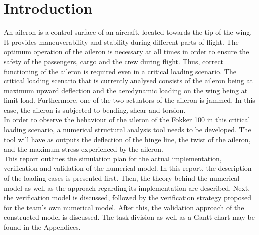 \section{Introduction}
\label{Introduction}


An aileron is a control surface of an aircraft, located towards the tip of the wing. It provides maneuverability and stability during different parts of flight. The optimum operation of the aileron is necessary at all times in order to ensure the safety of the passengers, cargo and the crew during flight. Thus, correct functioning of the aileron is required even in a critical loading scenario. The critical loading scenario that is currently analysed consists of the aileron being at maximum upward deflection and the aerodynamic loading on the
wing being at limit load. Furthermore, one of the two actuators of the aileron is jammed. In this case, the aileron is subjected to bending, shear and torsion. \\

\noindent In order to observe the behaviour of the aileron of the Fokker 100 in this critical loading scenario, a numerical structural analysis tool needs to be developed. The tool will have as outputs the deflection of the hinge line, the twist of the aileron, and the maximum stress experienced by the aileron.\\

\noindent This report outlines the simulation plan for the actual implementation, verification and validation of the numerical model. In this report, the description of the loading cases is presented first. Then, the theory behind the numerical model as well as the approach regarding its implementation are described. Next, the verification model is discussed, followed by the verification strategy proposed for the team's own numerical model. After this, the validation approach of the constructed model is discussed. The task division as well as a Gantt chart may be found in the Appendices.   
